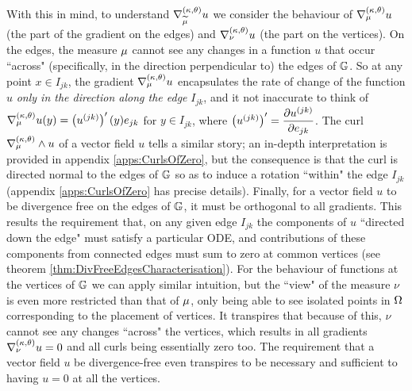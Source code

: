 With this in mind, to understand $\nabla^{\left( \kappa, \theta \right)}_{\widetilde{\mu}}u$ we consider the behaviour of $\nabla^{\left( \kappa, \theta \right)}_{\mu}u$ (the part of the gradient on the edges) and $\nabla^{\left( \kappa, \theta \right)}_{\nu}u$ (the part on the vertices).
On the edges, the measure $\mu$ cannot see any changes in a function $u$ that occur ``across" (specifically, in the direction perpendicular to) the edges of $\mathbb{G}$.
So at any point $x\in I_{jk}$, the gradient $\nabla^{\left( \kappa, \theta \right)}_{\mu}u$ encapsulates the rate of change of the function $u$ \emph{only in the direction along the edge} $I_{jk}$, and it not inaccurate to think of $\nabla^{\left( \kappa, \theta \right)}_{\mu}u(y) = \left( u^{(jk)} \right)'(y)e_{jk}$ for $y\in I_{jk}$, where $\left( u^{(jk)} \right)' = \dfrac{\partial u^{(jk)}}{\partial e_{jk}}$.
The curl $\nabla_{\mu}^{\left( \kappa, \theta \right)}\wedge u$ of a vector field $u$ tells a similar story; an in-depth interpretation is provided in appendix \ref{apps:CurlsOfZero}, but the consequence is that the curl is directed normal to the edges of $\mathbb{G}$ so as to induce a rotation ``within" the edge $I_{jk}$ (appendix \ref{apps:CurlsOfZero} has precise details).
Finally, for a vector field $u$ to be divergence free on the edges of $\mathbb{G}$, it must be orthogonal to all gradients.
This results the requirement that, on any given edge $I_{jk}$ the components of $u$ ``directed down the edge" must satisfy a particular ODE, and contributions of these components from connected edges must sum to zero at common vertices (see theorem \ref{thm:DivFreeEdgesCharacterisation}).
For the behaviour of functions at the vertices of $\mathbb{G}$ we can apply similar intuition, but the ``view" of the measure $\nu$ is even more restricted than that of $\mu$, only being able to see isolated points in $\Omega$ corresponding to the placement of vertices.
It transpires that because of this, $\nu$ cannot see any changes ``across" the vertices, which results in all gradients $\nabla^{\left( \kappa, \theta \right)}_{\nu}u=0$ and all curls being essentially zero too.
The requirement that a vector field $u$ be divergence-free even transpires to be necessary and sufficient to having $u=0$ at all the vertices.

